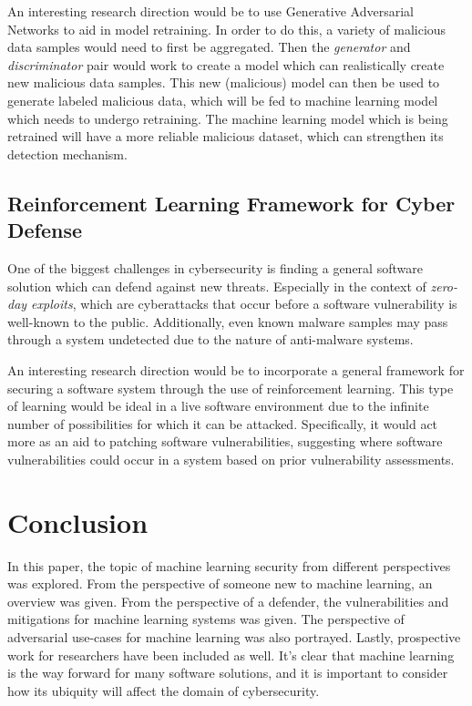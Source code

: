 \documentclass[11pt,conference]{IEEEtran}
\begin{document}
An interesting research direction would be to use Generative Adversarial
Networks to aid in model retraining. In order to do this, a
variety of malicious data samples would need to first be aggregated. Then the
\emph{generator} and \emph{discriminator} pair would work to create a model
which can realistically create new malicious data samples. This new (malicious)
model can then be used to generate labeled malicious data, which will be fed to
machine learning model which needs to undergo retraining. The machine learning
model which is being retrained will have a more reliable malicious dataset,
which can strengthen its detection mechanism.

\subsection{Reinforcement Learning Framework for Cyber Defense}
One of the biggest challenges in cybersecurity is finding a general software
solution which can defend against new threats. Especially in the
context of \emph{zero-day exploits}, which are cyberattacks that occur before a
software vulnerability is well-known to the public. Additionally, even known
malware samples may pass through a system undetected due to the nature of
anti-malware systems.

An interesting research direction would be to incorporate a general framework
for securing a software system through the use of reinforcement learning. This
type of learning would be ideal in a live software environment due to the
infinite number of possibilities for which it can be attacked. Specifically, it
would act more as an aid to patching software vulnerabilities, suggesting where
software vulnerabilities could occur in a system based on prior vulnerability
assessments.

\section{Conclusion}
In this paper, the topic of machine learning security from different
perspectives was explored. From the perspective of someone new to machine
learning, an overview was given. From the perspective of a defender, the
vulnerabilities and mitigations for machine learning systems was given. The
perspective of adversarial use-cases for machine learning was also portrayed. Lastly,
prospective work for researchers have been included as well. It's clear that
machine learning is the way forward for many software solutions, and it is
important to consider how its ubiquity will affect the domain of cybersecurity. 
\end{document}
